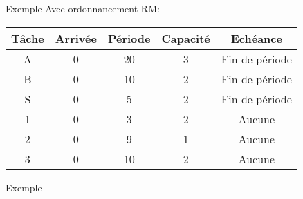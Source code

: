 \begin{frame}{Exemple}
  Avec ordonnancement RM:
  \begin{center}
    \begin{tabular}{ccccc}
      \hline
      Tâche & Arrivée & Période & Capacité & Echéance \\
      \hline
      A & 0 & 20 & 3 & Fin de période\\
      B & 0 & 10 & 2 & Fin de période\\
      S & 0 &  5 & 2 & Fin de période\\
      1 & 0 &  3 & 2 & Aucune\\
      2 & 0 &  9 & 1 & Aucune\\
      3 & 0 & 10 & 2 & Aucune\\
      \hline
    \end{tabular}
  \end{center}
\end{frame}
\begin{frame}{Exemple}
  
\end{frame} 



